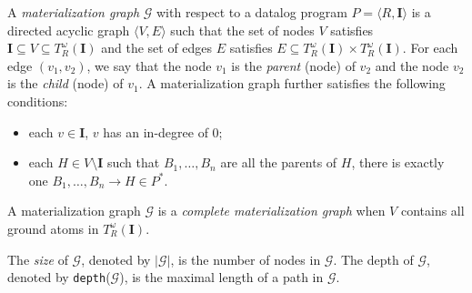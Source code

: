 
\begin{definition}\label{def:mg}
  A \emph{materialization graph} $\mathcal{G}$ with respect to a
  datalog program $P=\langle R, \textbf{I}\rangle$ is a directed
  acyclic graph $\langle V, E\rangle$ such that the set of nodes $V$
  satisfies $\textbf{I} \subseteq V\subseteq T_R^{\omega}(\textbf{I})$
  and the set of edges $E$ satisfies
  $E\subseteq T_R^{\omega}(\textbf{I})\times
  T_R^{\omega}(\textbf{I})$. For each edge $(v_1, v_2)$, we say that
  the node $v_1$ is the \emph{parent} (node) of $v_2$ and the node
  $v_2$ is the \emph{child} (node) of $v_1$. A materialization graph
  further satisfies the following conditions:
  \begin{itemize}
  \item each $v \in \textbf{I}$, $v$ has an in-degree of $0$;
  \item each $H \in V \setminus \textbf{I}$ such that $B_1,\ldots,B_n$
    are all the parents of $H$, there is exactly one
    $B_1,\ldots,B_n\rightarrow H\in P^*$.
  \end{itemize}
  A materialization graph $\mathcal{G}$ is a \emph{complete
    materialization graph} when $V$ contains all ground atoms in
  $T_R^{\omega}(\textbf{I})$.

  The \emph{size} of $\mathcal{G}$, denoted by $|\mathcal{G}|$, is the
  number of nodes in $\mathcal{G}$.  The depth of $\mathcal{G}$,
  denoted by \texttt{depth}($\mathcal{G}$), is the maximal length of a
  path in $\mathcal{G}$.
\end{definition}

